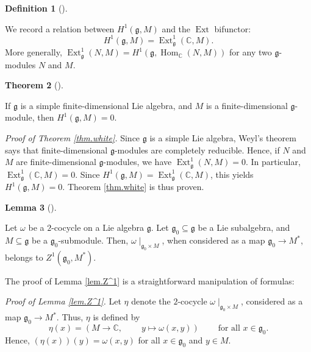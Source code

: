 \documentclass
[numbers=enddot,12pt,final,onecolumn,german,notitlepage]{scrartcl}%
\theoremstyle{definition}
\newtheorem{theo}{Theorem}
\newenvironment{theorem}[1][]
{\begin{theo}[#1]\begin{leftbar}}
{\end{leftbar}\end{theo}}
\newtheorem{lem}[theo]{Lemma}
\newenvironment{lemma}[1][]
{\begin{lem}[#1]\begin{leftbar}}
{\end{leftbar}\end{lem}}
\newtheorem{defi}[theo]{Definition}
\newenvironment{definition}[1][]
{\begin{defi}[#1]\begin{leftbar}}
{\end{leftbar}\end{defi}}
\begin{document}
\begin{definition}
We record a relation between $H^{1}\left(  \mathfrak{g},M\right)  $ and the
$\operatorname*{Ext}$ bifunctor:%
\[
H^{1}\left(  \mathfrak{g},M\right)  =\operatorname*{Ext}%
\nolimits_{\mathfrak{g}}^{1}\left(  \mathbb{C},M\right)  .
\]
More generally, $\operatorname*{Ext}\nolimits_{\mathfrak{g}}^{1}\left(
N,M\right)  =H^{1}\left(  \mathfrak{g},\operatorname*{Hom}%
\nolimits_{\mathbb{C}}\left(  N,M\right)  \right)  $ for any two
$\mathfrak{g}$-modules $N$ and $M$.
\end{definition}

\begin{theorem}
[Whitehead]\label{thm.white}If $\mathfrak{g}$ is a simple finite-dimensional
Lie algebra, and $M$ is a finite-dimensional $\mathfrak{g}$-module, then
$H^{1}\left(  \mathfrak{g},M\right)  =0$.
\end{theorem}

\textit{Proof of Theorem \ref{thm.white}.} Since $\mathfrak{g}$ is a simple
Lie algebra, Weyl's theorem says that finite-dimensional $\mathfrak{g}%
$-modules are completely reducible. Hence, if $N$ and $M$ are
finite-dimensional $\mathfrak{g}$-modules, we have $\operatorname*{Ext}%
\nolimits_{\mathfrak{g}}^{1}\left(  N,M\right)  =0$. In particular,
$\operatorname*{Ext}\nolimits_{\mathfrak{g}}^{1}\left(  \mathbb{C},M\right)
=0$. Since $H^{1}\left(  \mathfrak{g},M\right)  =\operatorname*{Ext}%
\nolimits_{\mathfrak{g}}^{1}\left(  \mathbb{C},M\right)  $, this yields
$H^{1}\left(  \mathfrak{g},M\right)  =0$. Theorem \ref{thm.white} is thus proven.

\begin{lemma}
\label{lem.Z^1}Let $\omega$ be a $2$-cocycle on a Lie algebra $\mathfrak{g}$.
Let $\mathfrak{g}_{0}\subseteq\mathfrak{g}$ be a Lie subalgebra, and
$M\subseteq\mathfrak{g}$ be a $\mathfrak{g}_{0}$-submodule. Then, $\omega
\mid_{\mathfrak{g}_{0}\times M}$, when considered as a map $\mathfrak{g}%
_{0}\rightarrow M^{\ast}$, belongs to $Z^{1}\left(  \mathfrak{g}_{0},M^{\ast
}\right)  $.
\end{lemma}

The proof of Lemma \ref{lem.Z^1} is a straightforward manipulation of formulas:

\textit{Proof of Lemma \ref{lem.Z^1}.} Let $\eta$ denote the $2$-cocycle
$\omega\mid_{\mathfrak{g}_{0}\times M}$, considered as a map $\mathfrak{g}%
_{0}\rightarrow M^{\ast}$. Thus, $\eta$ is defined by%
\[
\eta\left(  x\right)  =\left(  M\rightarrow\mathbb{C}%
,\ \ \ \ \ \ \ \ \ \ y\mapsto\omega\left(  x,y\right)  \right)
\ \ \ \ \ \ \ \ \ \ \text{for all }x\in\mathfrak{g}_{0}.
\]
Hence, $\left(  \eta\left(  x\right)  \right)  \left(  y\right)
=\omega\left(  x,y\right)  $ for all $x\in\mathfrak{g}_{0}$ and $y\in M$.
\end{document}
